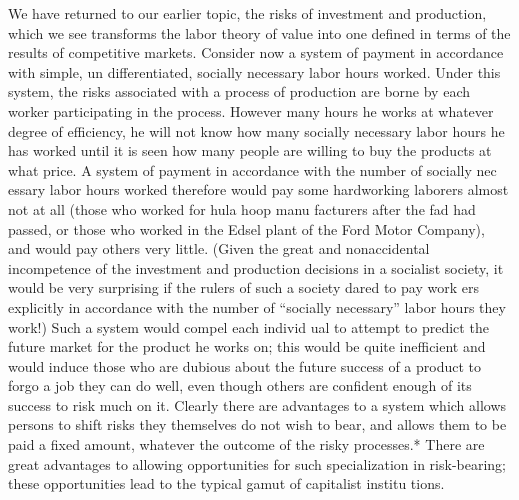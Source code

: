 \documentclass[11pt,openany]{book}
\begin{document}
We have returned to our earlier topic, the risks of investment and production, which we see transforms the labor theory of value into one defined in terms of the results of competitive markets. Consider now a system of payment in accordance with simple, un differentiated, socially necessary labor hours worked. Under this system, the risks associated with a process of production are borne by each worker participating in the process. However many hours he works at whatever degree of efficiency, he will not know how many socially necessary labor hours he has worked until it is seen how many people are willing to buy the products at what price. A system of payment in accordance with the number of socially nec essary labor hours worked therefore would pay some hardworking laborers almost not at all (those who worked for hula hoop manu facturers after the fad had passed, or those who worked in the Edsel plant of the Ford Motor Company), and would pay others very little. (Given the great and nonaccidental incompetence of the investment and production decisions in a socialist society, it would be very surprising if the rulers of such a society dared to pay work ers explicitly in accordance with the number of ``socially necessary'' labor hours they work!) Such a system would compel each individ ual to attempt to predict the future market for the product he works on; this would be quite inefficient and would induce those who are dubious about the future success of a product to forgo a job they can do well, even though others are confident enough of its success to risk much on it. Clearly there are advantages to a system which allows persons to shift risks they themselves do not wish to bear, and allows them to be paid a fixed amount, whatever the outcome of the risky processes.* There are great advantages to allowing opportunities for such specialization in risk-bearing; these opportunities lead to the typical gamut of capitalist institu tions. 
\end{document}
